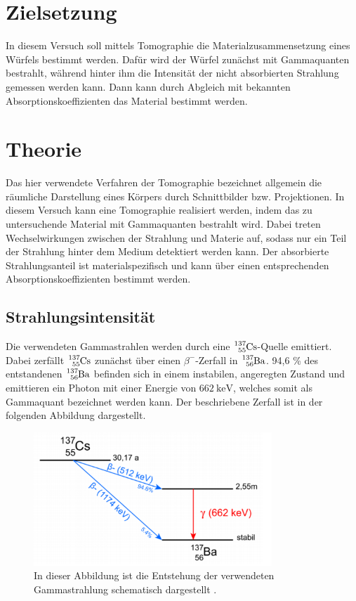 \section{Zielsetzung}
\label{sec:Zielsetzung}

In diesem Versuch soll mittels Tomographie die Materialzusammensetzung eines Würfels
bestimmt werden. Dafür wird der Würfel zunächst mit Gammaquanten bestrahlt, 
während hinter ihm die Intensität der nicht absorbierten Strahlung gemessen werden 
kann. Dann kann durch Abgleich mit bekannten Absorptionskoeffizienten das Material bestimmt
werden.

\section{Theorie}
\label{sec:Theorie}

Das hier verwendete Verfahren der Tomographie bezeichnet allgemein die räumliche Darstellung 
eines Körpers durch Schnittbilder bzw. Projektionen. In diesem Versuch kann eine 
Tomographie realisiert werden, indem das zu untersuchende Material mit Gammaquanten 
bestrahlt wird. Dabei treten Wechselwirkungen zwischen der Strahlung und Materie auf, 
sodass nur ein Teil der Strahlung hinter dem Medium detektiert werden kann. 
Der absorbierte Strahlungsanteil ist materialspezifisch und kann über einen entsprechenden
Absorptionskoeffizienten bestimmt werden.

\subsection{Strahlungsintensität}

Die verwendeten Gammastrahlen werden durch eine $\ce{^137_55Cs}$-Quelle emittiert. 
Dabei zerfällt $\ce{^137_55Cs}$ zunächst über einen $\beta^-$-Zerfall in  $\ce{^137_56Ba}$.
94,6 \% des entstandenen $\ce{^137_56Ba}$ befinden sich in einem instabilen, angeregten 
Zustand und emittieren ein Photon mit einer Energie von $\SI{662}{\kilo\eV}$, welches 
somit als Gammaquant bezeichnet werden kann. 
Der beschriebene Zerfall ist in der folgenden Abbildung dargestellt.

\begin{figure}
	\centering
	\includegraphics[width=0.8\textwidth]{figure/Zerfall.pdf}
	\caption{In dieser Abbildung ist die Entstehung der verwendeten Gammastrahlung
	schematisch dargestellt \cite{1}.} 
	\label{abb1}
\end{figure}

